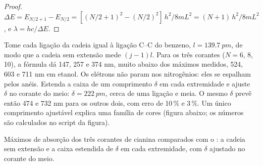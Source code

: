 \begin{proof}
$\Delta E = E_{N/2+1} - E_{N/2} = [(N/2+1)^2 - (N/2)^2]\,h^2/8mL^2 =
(N+1)\,h^2/8mL^2$, e $\lambda = hc/\Delta E$.
\end{proof}

\begin{example}\label{ex:b3:quantum-model-systems:dyes}
Tome cada ligação da cadeia igual à ligação C--C do benzeno,
$l = \qty{139.7}{pm}$, de modo que a cadeia sem extensão mede $(j - 1)l$.
Para os três corantes ($N = 6$, 8, 10), a fórmula dá 147, 257 e 374 nm,
muito abaixo dos máximos medidos, 524, 603 e 711 nm em etanol. Os elétrons
não param nos nitrogênios: eles se espalham pelos anéis. Estenda a caixa
de um comprimento $\delta$ em cada extremidade e ajuste $\delta$ no corante
do meio: $\delta = \qty{222}{pm}$, cerca de uma ligação e meia. O mesmo
$\delta$ prevê então 474 e 732 nm para os outros dois, com erro de 10\,\%
e 3\,\%. Um único comprimento ajustável explica uma família de cores (figura
abaixo; os números são calculados no script da figura).
\end{example}

\begin{omfigure}

{\small Máximos de absorção dos três corantes de cianina comparados com o
: a cadeia sem extensão e a caixa estendida de
$\delta$ em cada extremidade, com $\delta$ ajustado no corante do meio.}
\end{omfigure}

